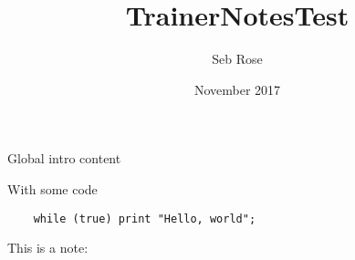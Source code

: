 \documentclass{article}
\title{TrainerNotesTest}
\author{Seb Rose}
\date{November 2017}
\begin{document}
\maketitle



Global intro content

With some code

\begin{verbatim}
    while (true) print "Hello, world"; 
\end{verbatim}
\fi

\IFNOTES
    This is a note:
    
\fi
\end{document}
